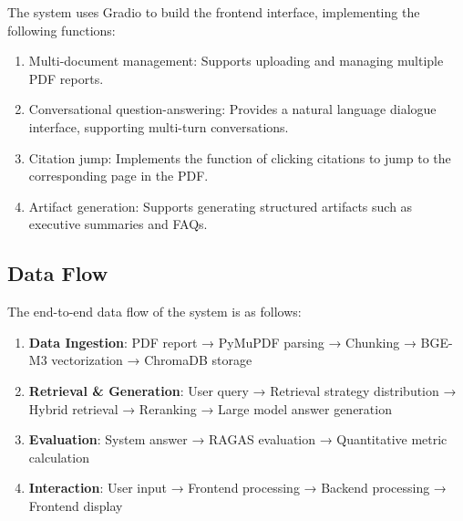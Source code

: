 The system uses Gradio to build the frontend interface, implementing the
following functions:

\begin{enumerate}
    \item Multi-document management: Supports uploading and managing multiple PDF
          reports.
    \item Conversational question-answering: Provides a natural language dialogue
          interface, supporting multi-turn conversations.
    \item Citation jump: Implements the function of clicking citations to jump to the
          corresponding page in the PDF.
    \item Artifact generation: Supports generating structured artifacts such as executive
          summaries and FAQs.
\end{enumerate}

\subsection{Data Flow}

The end-to-end data flow of the system is as follows:

\begin{enumerate}
    \item \textbf{Data Ingestion}: PDF report → PyMuPDF parsing → Chunking → BGE-M3 vectorization → ChromaDB storage
    \item \textbf{Retrieval \& Generation}: User query → Retrieval strategy distribution → Hybrid retrieval → Reranking → Large model answer generation
    \item \textbf{Evaluation}: System answer → RAGAS evaluation → Quantitative metric calculation
    \item \textbf{Interaction}: User input → Frontend processing → Backend processing → Frontend display
\end{enumerate}
